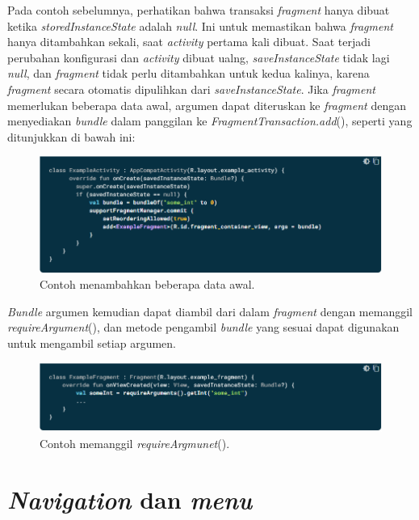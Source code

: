 \begin{enumerate}
Pada contoh sebelumnya, perhatikan bahwa transaksi \textit{fragment} hanya dibuat ketika \textit{storedInstanceState} adalah \textit{null}. Ini untuk memastikan bahwa \textit{fragment} hanya ditambahkan sekali, saat \textit{activity} pertama kali dibuat. Saat terjadi perubahan konfigurasi dan \textit{activity} dibuat ualng, \textit{saveInstanceState} tidak lagi \textit{null}, dan \textit{fragment} tidak perlu ditambahkan untuk kedua kalinya, karena \textit{fragment} secara otomatis dipulihkan dari \textit{saveInstanceState}.
Jika \textit{fragment} memerlukan beberapa data awal, argumen dapat diteruskan ke \textit{fragment} dengan menyediakan \textit{bundle} dalam panggilan ke \textit{FragmentTransaction.add}(), seperti yang ditunjukkan di bawah ini:
\begin{figure}[H]
	\centering
	\includegraphics[keepaspectratio, width=12cm]{gambar/fragment_add3}
	\caption{Contoh menambahkan beberapa data awal. \citep{developerandroid}}
	\label{gambar:gambar_35}
\end{figure}
\textit{Bundle} argumen kemudian dapat diambil dari dalam \textit{fragment} dengan memanggil \textit{requireArgument}(), dan metode pengambil \textit{bundle} yang sesuai dapat digunakan untuk mengambil setiap argumen.
\begin{figure}[H]
	\centering
	\includegraphics[keepaspectratio, width=12cm]{gambar/fragment_add4}
	\caption{Contoh memanggil \textit{requireArgmunet}(). \citep{developerandroid}}
	\label{gambar:gambar_36}
\end{figure}
\end{enumerate}

\section{\emph{Navigation} dan \emph{menu}}

